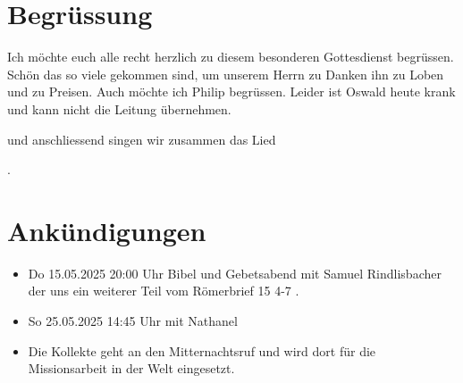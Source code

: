 \documentclass{../../inc/mybib}
\begin{document}
\section{Begrüssung}

Ich möchte euch alle recht herzlich zu diesem besonderen Gottesdienst begrüssen. Schön das so viele gekommen sind, um unserem Herrn zu Danken ihn zu Loben und zu Preisen.
Auch möchte ich Philip begrüssen. Leider ist Oswald heute krank und kann nicht die Leitung übernehmen.

\noindent
\beten{} und anschliessend singen wir zusammen das Lied

\noindent
{}.

\section{Ankündigungen}
\begin{itemize}
    \item {} Do 15.05.2025 20:00 Uhr Bibel und Gebetsabend mit Samuel Rindlisbacher der uns ein weiterer Teil vom Römerbrief 15 4-7 .
    \item {} So 25.05.2025 14:45 Uhr mit Nathanel    
    \item {} Die Kollekte geht an den Mitternachtsruf und wird dort für die Missionsarbeit in der Welt eingesetzt.
\end{itemize}
\end{document}
